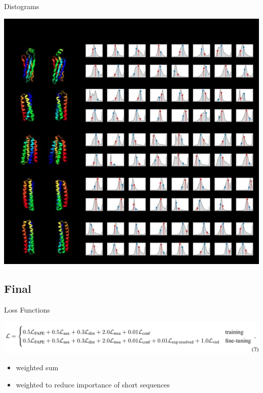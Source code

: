 \documentclass[presentation, smaller]{beamer}
\begin{document}
\begin{frame}[label={sec:orge977939}]{Distograms \cite{jumperHighlyAccurateProtein2021}}
\begin{center}
\includegraphics[height=\textheight]{./imgs/Examples-of-distograms-from-trRosetta.jpg}
\end{center}
\end{frame}

\subsection*{Final}
\label{sec:org4e62b61}
\begin{frame}[label={sec:org59842c1}]{Loss Functions  \cite{jumperHighlyAccurateProtein2021}}
\begin{center}
\includegraphics[width=.9\linewidth]{./imgs/loss-eq.png}
\end{center}

\begin{itemize}
\item weighted sum
\item weighted to reduce importance of short sequences
\end{itemize}
\end{frame}
\end{document}
